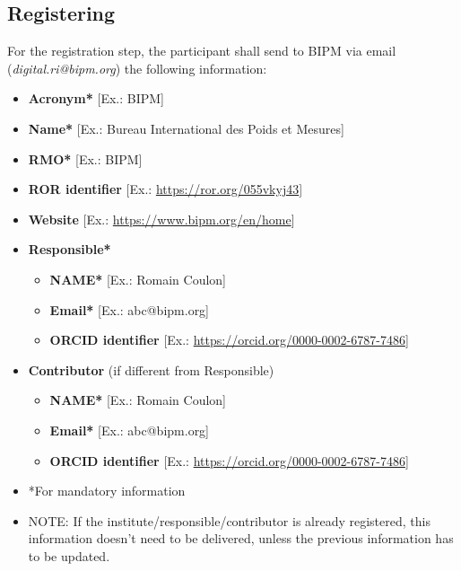 \documentclass[12pt]{iopart}
\begin{document}
\subsection{Registering}

For the registration step, the participant shall send to BIPM via email (\emph{digital.ri@bipm.org}) the following information: \\
\begin{itemize}[leftmargin=2em, label={}]  %
  \item \textbf{Acronym*} [Ex.: BIPM]
  \item \textbf{Name*} [Ex.: Bureau International des Poids et Mesures]
  \item \textbf{RMO*} [Ex.: BIPM]
  \item \textbf{ROR identifier} [Ex.: \href{https://ror.org/055vkyj43}{https://ror.org/055vkyj43}]
  \item \textbf{Website} [Ex.: \href{https://www.bipm.org/en/home}{https://www.bipm.org/en/home}]
  \item \textbf{Responsible*}
  \begin{itemize}[leftmargin=3em]
    \item \textbf{NAME*} [Ex.: Romain Coulon]
    \item \textbf{Email*} [Ex.: abc@bipm.org]
    \item \textbf{ORCID identifier} [Ex.: \href{https://orcid.org/0000-0002-6787-7486}{https://orcid.org/0000-0002-6787-7486}]
  \end{itemize}
  \item \textbf{Contributor} (if different from Responsible)
  \begin{itemize}[leftmargin=3em]
    \item \textbf{NAME*} [Ex.: Romain Coulon]
    \item \textbf{Email*} [Ex.: abc@bipm.org]
    \item \textbf{ORCID identifier} [Ex.: \href{https://orcid.org/0000-0002-6787-7486}{https://orcid.org/0000-0002-6787-7486}]
  \end{itemize}
  \item *For mandatory information \\

  \item NOTE: If the institute/responsible/contributor is already registered, this information doesn’t need to be delivered, unless the previous information has to be updated.
\end{itemize}
\end{document}
